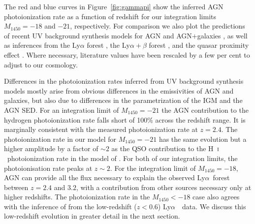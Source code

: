 \documentclass[fleqn,usenatbib]{mnras}
\def\lya{Ly$\alpha$~}
\def\HI{\hbox{H~$\scriptstyle\rm I$}}
\begin{document}
The red and blue curves in Figure~\ref{fig:gammapi} show the inferred
AGN  photoionization rate as a function of redshift for our
integration limits $M_{1450}=-18$ and $-21$, respectively. For
comparison we also plot the predictions of recent UV background
synthesis models for AGN
\citep{2012ApJ...746..125H,2015ApJ...813L...8M,2015MNRAS.451L..30K}
and AGN$+$galaxies \citep{2012ApJ...746..125H,2018arXiv180104931P}, as
well as inferences from the  Ly$\alpha$ forest
\citep{2011MNRAS.412.1926W,2013MNRAS.436.1023B,2017MNRAS.467.3172G,2018MNRAS.473..560D},
the Ly$\alpha+\beta$ forest \citep{2018ApJ...855..106D}, and the
quasar proximity effect \citep{2011MNRAS.412.2543C}.  Where necessary,
literature values have been rescaled by a few per cent to adjust to
our cosmology.

Differences in the  photoionization rates inferred from UV
background synthesis models mostly arise from obvious differences in
the emissivities of AGN and galaxies, but also due to differences in
the parametrization of the IGM and the AGN SED.  For an integration
limit of $M_{1450}=-21$ the AGN contribution to the hydrogen
photoionization rate falls short of 100\% across the redshift range.
It is marginally consistent with the measured photoionization rate at
$z=2.4$.  The photoionization rate in our model for $M_{1450}=-21$ has
the same evolution but a higher amplitude by a factor of $\sim 2$ as
the QSO contribution to the \HI\ photoionization rate in the model of
\citet{2012ApJ...746..125H}.  For both of our integration limits, the
photoionisation rate peaks at $z\sim 2$.  For the integration limit of
$M_{1450}=-18$, AGN can provide all the flux necessary to explain the
observed \lya forest between $z=2.4$ and $3.2$, with a contribution
from other sources necessary only at higher redshifts.  The
photoionization rate in the $M_{1450}<-18$ case also agrees with the
inference of \citet{2017MNRAS.467.3172G} from the low-redshift
($z<0.6$) \lya\ data.  We discuss this low-redshift evolution in
greater detail in the next section.
\end{document}
